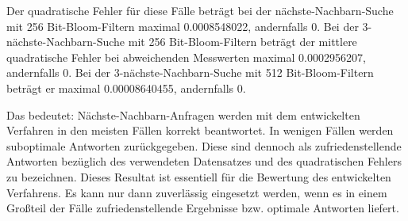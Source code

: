 Der quadratische Fehler für diese Fälle beträgt bei der nächste-Nachbarn-Suche mit 256 Bit-Bloom-Filtern maximal 0.0008548022, andernfalls 0. Bei der 3-nächste-Nachbarn-Suche mit 256 Bit-Bloom-Filtern beträgt der mittlere quadratische Fehler bei abweichenden Messwerten maximal 0.0002956207, andernfalls 0. Bei der 3-nächste-Nachbarn-Suche mit 512 Bit-Bloom-Filtern beträgt er maximal 0.00008640455, andernfalls 0.

Das bedeutet: Nächste-Nachbarn-Anfragen werden mit dem entwickelten Verfahren in den meisten Fällen korrekt beantwortet. In wenigen Fällen werden suboptimale Antworten zurückgegeben. Diese sind dennoch als zufriedenstellende Antworten bezüglich des verwendeten Datensatzes und des quadratischen Fehlers zu bezeichnen. Dieses Resultat ist essentiell für die Bewertung des entwickelten Verfahrens. Es kann nur dann zuverlässig eingesetzt werden, wenn es in einem Großteil der Fälle zufriedenstellende Ergebnisse bzw. optimale Antworten liefert. 

